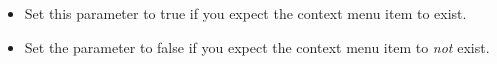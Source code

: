 
\begin{itemize}
\item Set this parameter to true if you expect the context menu item to exist.
\item Set the parameter to false if you expect the context menu item to \emph{not} exist. 
\end{itemize}
